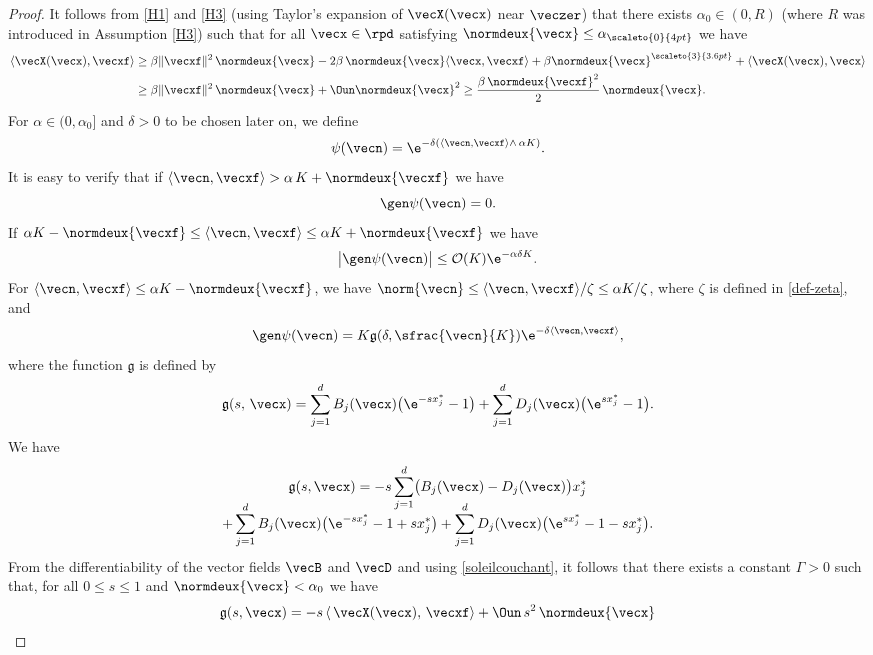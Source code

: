 \begin{proof}
It follows from \eqref{H1} and \eqref{H3} (using Taylor's expansion of $\vecX(\vecx)$ near $\veczer$) that there exists $\alpha_{0}\in(0,R)$ (where $R$ was introduced in Assumption \eqref{H3}) such that for all $\vecx\in \rpd$ satisfying $\normdeux{\vecx}\le \alpha_{\scaleto{0}{4pt}}$ we have
\begin{align}
\nonumber
\langle \vecX(\vecx), \vecxf\rangle
& \geq \beta \|\vecxf\|^{2} \, \normdeux{\vecx} - 2\beta\, \normdeux{\vecx} \langle \vecx,\vecxf\rangle + \beta \normdeux{\vecx}^{\scaleto{3}{3.6pt}} + \langle \vecX(\vecx), \vecx \rangle \\
& \geq \beta\|\vecxf\|^{2}\, \normdeux{\vecx} + \Oun \normdeux{\vecx}^{2}
\geq \frac{\beta\,\normdeux{\vecxf}^{2}}{2}\,\normdeux{\vecx}.
\label{soleilcouchant}
\end{align}
For $\alpha\in(0,\alpha_{0}]$ and $\delta>0$ to be chosen later on, we define
\[
\psi(\vecn)=\e^{-\delta(\langle \vecn,\vecxf\rangle\wedge\, \alpha K)}.
\]
It is easy to verify that if $\langle \vecn, \vecxf\rangle>\alpha\,K+\normdeux{\vecxf}$ we have
\[
\gen \psi(\vecn)=0.
\]
If $\alpha K-\normdeux{\vecxf}\le \langle \vecn, \vecxf\rangle\le \alpha K+\normdeux{\vecxf}$ we have
\[
\big|\gen \psi(\vecn)\big|\le {\cal O}(K) \e^{-\alpha\delta K}.
\]
For $\langle \vecn, \vecxf\rangle\le \alpha K-\normdeux{\vecxf}$, we have $\norm{\vecn}\le \langle \vecn,\vecxf\rangle/\zeta\le \alpha K/\zeta$, where $\zeta$ is defined in \eqref{def-zeta}, and
\[
\gen \psi(\vecn) = K \mathfrak{g}(\delta, \sfrac{\vecn}{K}) \e^{-\delta \langle \vecn,\vecxf\rangle},
\]
where the function $\mathfrak{g}$ is defined by
\[
\mathfrak{g}(s,\,\vecx)=\sum_{j=1}^{d}B_{j}(\vecx)\bigl(\e^{-s x_{j}^*}-1\bigr)+\sum_{j=1}^{d}D_{j}(\vecx)\bigl(\e^{s x_{j}^*}-1\bigr).
\]
We have\vspace*{-5pt}
\begin{multline*}
\mathfrak{g}(s,\vecx)=-s\sum_{j=1}^{d}\bigl(B_{j}(\vecx)-D_{j}(\vecx)\bigr)x_{j}^*\\[-10pt]
+\sum_{j=1}^{d}B_{j}(\vecx)\bigl(\e^{-s x_{j}^*}-1+s x_{j}^*\bigr)
+\sum_{j=1}^{d}D_{j}(\vecx)\bigl(\e^{s x_{j}^*}-1-s x_{j}^*\bigr).
\end{multline*}
From the differentiability of the vector fields $\vecB$ and $\vecD$ and using \eqref{soleilcouchant}, it
follows that there exists a constant $\Gamma>0$ such that, for all $0\le s\le 1$ and $\normdeux{\vecx}<\alpha_{0}$ we have
\begin{align*}
\mathfrak{g}(s,\vecx)
& = -s\, \langle\, \vecX(\vecx),\, \vecxf\rangle+ \Oun\, s^2\, \normdeux{\vecx} \\

\end{align*}
\end{proof}
